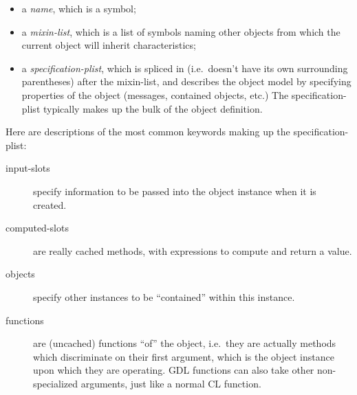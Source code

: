 \documentclass [11pt]{book}
\begin{document}
\begin{itemize}

\item a \emph{name}, which is a symbol;

\item a \emph{mixin-list}, which is a list of symbols naming other objects from which the current object 
will inherit characteristics;

\item a \emph{specification-plist}, which is spliced in (i.e.\ doesn't have its own surrounding 
parentheses) after the mixin-list, and describes
the object model by specifying properties of the object (messages, contained objects, etc.)
The specification-plist typically makes up the bulk of the object definition.

\end{itemize}



Here are descriptions of the most common keywords making up the specification-plist:

\begin{description}

\item [input-slots]
specify information to be passed into the object instance when it is created.

\item [computed-slots]
are really cached methods, with expressions to compute and return a value.

\item [objects]
specify other instances to be ``contained'' within this instance.

\item [functions]
are (uncached) functions ``of'' the object, i.e.\ they are actually methods which
discriminate on their first argument, which is the object instance upon which they are operating. 
GDL functions can also take other non-specialized arguments, just like a normal CL function.

\end{description}
\end{document}
